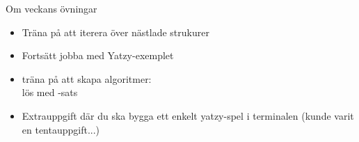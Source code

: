 

\begin{Slide}{Om veckans övningar}\SlideFontSmall
\begin{itemize}
\item Träna på att iterera över nästlade strukurer

\item Fortsätt jobba med Yatzy-exemplet

\item träna på att skapa  algoritmer: \\
lös  med -sats 

\item Extrauppgift där du ska bygga ett enkelt yatzy-spel i terminalen (kunde varit en tentauppgift...)

\end{itemize}
\end{Slide}

%
%
%
%
%
%
%
%



